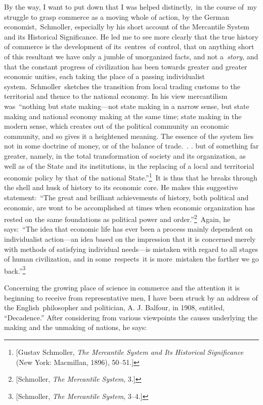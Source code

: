 \documentclass[twoside,symmetric,nobib,justified]{tufte-book}
\begin{document}
By the way, I want to put down that I was helped distinctly,~in the
course of~my struggle to grasp commerce as a moving whole of action, by
the German economist,~Schmoller, especially by his short account of the
Mercantile System and its Historical Significance. He led me to see more
clearly that the true history of commerce is the development of
its~centres~of control, that on anything short of this resultant we have
only a jumble of unorganized facts, and not a~\emph{story}, and that the
constant progress of civilization has been towards greater and greater
economic unities, each taking the place of a passing individualist
system.~Schmoller~sketches the transition from local trading customs to
the territorial and thence to the national economy. In his view
mercantilism was~``nothing but state making---not state making in a
narrow sense, but state making and national economy making at the same
time; state making in the modern sense, which creates out of the
political community an economic community, and so gives it a heightened
meaning. The essence of the system lies not in some doctrine of money,
or of the balance of trade.~. . but of something far greater, namely, in
the total transformation of society and its organization, as well as of
the State and its institutions, in the replacing of a local and
territorial economic policy by that of the national
State.''\footnote{{[}Gustav Schmoller, \emph{The Mercantile System and
  Its Historical Significance} (New York: Macmillan, 1896), 50--51.{]}}~It
is thus that he breaks through the shell and husk of history to its
economic core. He makes this suggestive statement:~``The great and
brilliant achievements of history, both political and economic, are wont
to be accomplished at times when economic organization has rested on the
same foundations as political power and order.''\footnote{{[}Schmoller,
  \emph{The Mercantile System}, 3.{]}}~Again, he says:~``The idea that
economic life has ever been a process mainly dependent on individualist
action---an idea based on the impression that it is concerned merely
with methods of satisfying individual needs---is mistaken with regard to
all stages of human civilization, and in some~respects~it is
more~mistaken the farther we go back.''\footnote{{[}Schmoller, \emph{The
  Mercantile System}, 3--4.{]}}

Concerning the growing place of science in commerce and the attention it
is beginning to receive from representative men, I have been struck by
an address of the English~philosopher and politician, A. J. Balfour, in
1908, entitled, ``Decadence.'' After considering from various viewpoints
the causes underlying the making and the unmaking of nations, he says:~
\end{document}
